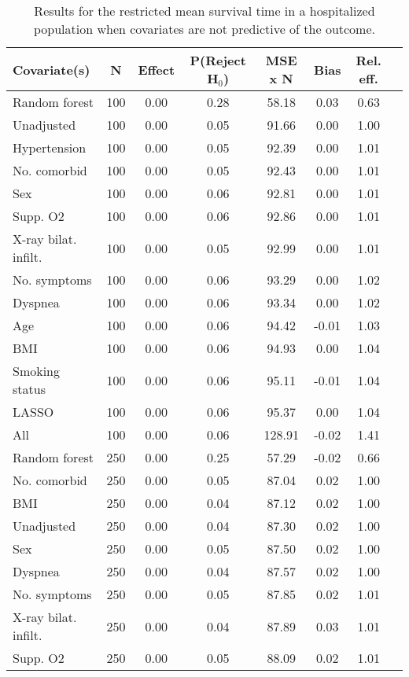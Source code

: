 \documentclass{article}
\begin{document}
{\tabcolsep=6pt  %
\begin{longtable}{lccccccc}
\caption{Results for the restricted mean survival time in a hospitalized population when covariates are not predictive of the outcome.} \\
Covariate(s) & N & Effect & P(Reject H$_0$) & MSE x N & Bias & Rel. eff.\\ \midrule
Random forest & 100 & 0.00 & 0.28 &  58.18 &  0.03 & 0.63 \\ 
Unadjusted & 100 & 0.00 & 0.05 &  91.66 &  0.00 & 1.00 \\ 
Hypertension & 100 & 0.00 & 0.05 &  92.39 &  0.00 & 1.01 \\ 
No. comorbid & 100 & 0.00 & 0.05 &  92.43 &  0.00 & 1.01 \\ 
Sex & 100 & 0.00 & 0.06 &  92.81 &  0.00 & 1.01 \\ 
Supp. O2 & 100 & 0.00 & 0.06 &  92.86 &  0.00 & 1.01 \\ 
X-ray bilat. infilt. & 100 & 0.00 & 0.05 &  92.99 &  0.00 & 1.01 \\ 
No. symptoms & 100 & 0.00 & 0.06 &  93.29 &  0.00 & 1.02 \\ 
Dyspnea & 100 & 0.00 & 0.06 &  93.34 &  0.00 & 1.02 \\ 
Age & 100 & 0.00 & 0.06 &  94.42 & -0.01 & 1.03 \\ 
BMI & 100 & 0.00 & 0.06 &  94.93 &  0.00 & 1.04 \\ 
Smoking status & 100 & 0.00 & 0.06 &  95.11 & -0.01 & 1.04 \\ 
LASSO & 100 & 0.00 & 0.06 &  95.37 &  0.00 & 1.04 \\ 
All & 100 & 0.00 & 0.06 & 128.91 & -0.02 & 1.41 \\ \midrule() 
Random forest & 250 & 0.00 & 0.25 &  57.29 & -0.02 & 0.66 \\ 
No. comorbid & 250 & 0.00 & 0.05 &  87.04 &  0.02 & 1.00 \\ 
BMI & 250 & 0.00 & 0.04 &  87.12 &  0.02 & 1.00 \\ 
Unadjusted & 250 & 0.00 & 0.04 &  87.30 &  0.02 & 1.00 \\ 
Sex & 250 & 0.00 & 0.05 &  87.50 &  0.02 & 1.00 \\ 
Dyspnea & 250 & 0.00 & 0.04 &  87.57 &  0.02 & 1.00 \\ 
No. symptoms & 250 & 0.00 & 0.05 &  87.85 &  0.02 & 1.01 \\ 
X-ray bilat. infilt. & 250 & 0.00 & 0.04 &  87.89 &  0.03 & 1.01 \\ 
Supp. O2 & 250 & 0.00 & 0.05 &  88.09 &  0.02 & 1.01 \\ 

\end{longtable}}
\end{document}
